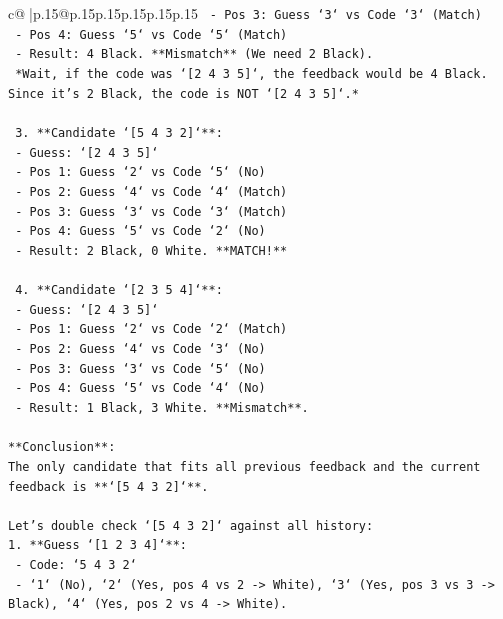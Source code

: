\documentclass{article}
\begin{document}
{\begin{supertabular}{c@{$\;$}|p{.15\linewidth}@{}p{.15\linewidth}p{.15\linewidth}p{.15\linewidth}p{.15\linewidth}p{.15\linewidth}}
{{{\texttt{      {-} Pos 3: Guess `3` vs Code `3` (Match)} \\
\texttt{      {-} Pos 4: Guess `5` vs Code `5` (Match)} \\
\texttt{      {-} Result: 4 Black. **Mismatch** (We need 2 Black).} \\
\texttt{      *Wait, if the code was `{[}2 4 3 5{]}`, the feedback would be 4 Black. Since it's 2 Black, the code is NOT `{[}2 4 3 5{]}`.*} \\
\\ 
\texttt{  3.  **Candidate `{[}5 4 3 2{]}`**:} \\
\texttt{      {-} Guess: `{[}2 4 3 5{]}`} \\
\texttt{      {-} Pos 1: Guess `2` vs Code `5` (No)} \\
\texttt{      {-} Pos 2: Guess `4` vs Code `4` (Match)} \\
\texttt{      {-} Pos 3: Guess `3` vs Code `3` (Match)} \\
\texttt{      {-} Pos 4: Guess `5` vs Code `2` (No)} \\
\texttt{      {-} Result: 2 Black, 0 White. **MATCH!**} \\
\\ 
\texttt{  4.  **Candidate `{[}2 3 5 4{]}`**:} \\
\texttt{      {-} Guess: `{[}2 4 3 5{]}`} \\
\texttt{      {-} Pos 1: Guess `2` vs Code `2` (Match)} \\
\texttt{      {-} Pos 2: Guess `4` vs Code `3` (No)} \\
\texttt{      {-} Pos 3: Guess `3` vs Code `5` (No)} \\
\texttt{      {-} Pos 4: Guess `5` vs Code `4` (No)} \\
\texttt{      {-} Result: 1 Black, 3 White. **Mismatch**.} \\
\\ 
\texttt{**Conclusion**:} \\
\texttt{The only candidate that fits all previous feedback and the current feedback is **`{[}5 4 3 2{]}`**.} \\
\\ 
\texttt{Let's double check `{[}5 4 3 2{]}` against all history:} \\
\texttt{1.  **Guess `{[}1 2 3 4{]}`**:} \\
\texttt{    {-} Code: `5 4 3 2`} \\
\texttt{    {-} `1` (No), `2` (Yes, pos 4 vs 2 {-}> White), `3` (Yes, pos 3 vs 3 {-}> Black), `4` (Yes, pos 2 vs 4 {-}> White).} \\
}}}
\end{supertabular}}
\end{document}
